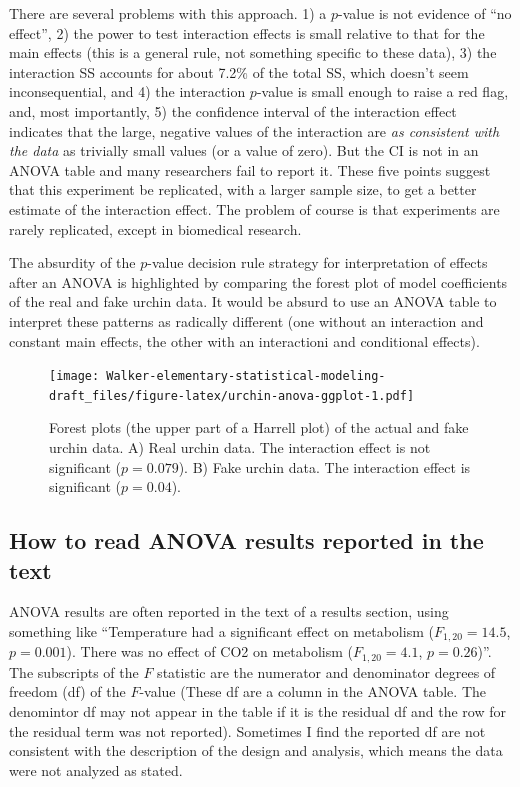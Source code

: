 \documentclass[]{book}
\begin{document}
There are several problems with this approach. 1) a \(p\)-value is not
evidence of ``no effect'', 2) the power to test interaction effects is
small relative to that for the main effects (this is a general rule, not
something specific to these data), 3) the interaction SS accounts for
about 7.2\(\%\) of the total SS, which doesn't seem inconsequential, and
4) the interaction \(p\)-value is small enough to raise a red flag, and,
most importantly, 5) the confidence interval of the interaction effect
indicates that the large, negative values of the interaction are
\emph{as consistent with the data} as trivially small values (or a value
of zero). But the CI is not in an ANOVA table and many researchers fail
to report it. These five points suggest that this experiment be
replicated, with a larger sample size, to get a better estimate of the
interaction effect. The problem of course is that experiments are rarely
replicated, except in biomedical research.

The absurdity of the \(p\)-value decision rule strategy for
interpretation of effects after an ANOVA is highlighted by comparing the
forest plot of model coefficients of the real and fake urchin data. It
would be absurd to use an ANOVA table to interpret these patterns as
radically different (one without an interaction and constant main
effects, the other with an interactioni and conditional effects).

\begin{figure}
\centering
\texttt{[image: Walker-elementary-statistical-modeling-draft\_files/figure-latex/urchin-anova-ggplot-1.pdf]}
\caption{\label{fig:urchin-anova-ggplot}Forest plots (the upper part of a
Harrell plot) of the actual and fake urchin data. A) Real urchin data.
The interaction effect is not significant (\(p=0.079\)). B) Fake urchin
data. The interaction effect is significant (\(p=0.04\)).}
\end{figure}

\subsection{How to read ANOVA results reported in the
text}\label{how-to-read-anova-results-reported-in-the-text}

ANOVA results are often reported in the text of a results section, using
something like ``Temperature had a significant effect on metabolism
(\(F_{1,20} = 14.5\), \(p=0.001\)). There was no effect of CO2 on
metabolism (\(F_{1,20} = 4.1\), \(p=0.26\))''. The subscripts of the
\(F\) statistic are the numerator and denominator degrees of freedom
(df) of the \(F\)-value (These df are a column in the ANOVA table. The
denomintor df may not appear in the table if it is the residual df and
the row for the residual term was not reported). Sometimes I find the
reported df are not consistent with the description of the design and
analysis, which means the data were not analyzed as stated.
\end{document}

